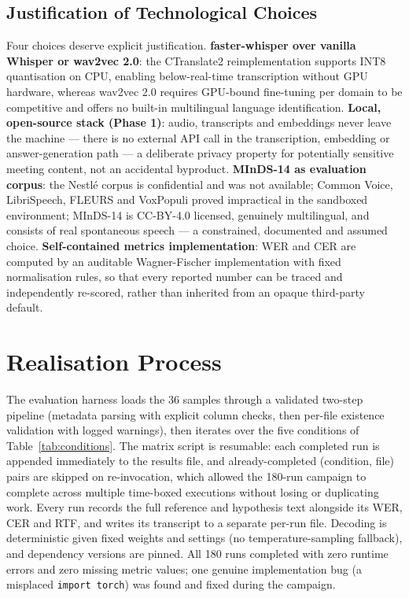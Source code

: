 \documentclass[12pt]{report}
\begin{document}
\subsection{Justification of Technological Choices}

Four choices deserve explicit justification. \textbf{faster-whisper over vanilla Whisper or wav2vec 2.0}: the CTranslate2 reimplementation supports INT8 quantisation on CPU, enabling below-real-time transcription without GPU hardware, whereas wav2vec 2.0 requires GPU-bound fine-tuning per domain to be competitive and offers no built-in multilingual language identification. \textbf{Local, open-source stack (Phase 1)}: audio, transcripts and embeddings never leave the machine --- there is no external API call in the transcription, embedding or answer-generation path --- a deliberate privacy property for potentially sensitive meeting content, not an accidental byproduct. \textbf{MInDS-14 as evaluation corpus}: the Nestl\'e corpus is confidential and was not available; Common Voice, LibriSpeech, FLEURS and VoxPopuli proved impractical in the sandboxed environment; MInDS-14 is CC-BY-4.0 licensed, genuinely multilingual, and consists of real spontaneous speech --- a constrained, documented and assumed choice. \textbf{Self-contained metrics implementation}: WER and CER are computed by an auditable Wagner-Fischer implementation with fixed normalisation rules, so that every reported number can be traced and independently re-scored, rather than inherited from an opaque third-party default.

\section{Realisation Process}

The evaluation harness loads the 36 samples through a validated two-step pipeline (metadata parsing with explicit column checks, then per-file existence validation with logged warnings), then iterates over the five conditions of Table~\ref{tab:conditions}. The matrix script is resumable: each completed run is appended immediately to the results file, and already-completed (condition, file) pairs are skipped on re-invocation, which allowed the 180-run campaign to complete across multiple time-boxed executions without losing or duplicating work. Every run records the full reference and hypothesis text alongside its WER, CER and RTF, and writes its transcript to a separate per-run file. Decoding is deterministic given fixed weights and settings (no temperature-sampling fallback), and dependency versions are pinned. All 180 runs completed with zero runtime errors and zero missing metric values; one genuine implementation bug (a misplaced \texttt{import torch}) was found and fixed during the campaign.
\end{document}

